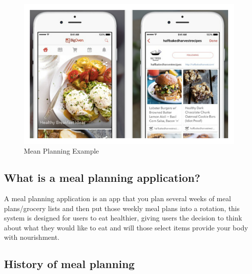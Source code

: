 \begin{center}
  \begin{figure}[H]
    \includegraphics[width=\textwidth]{img/mealplanningpic.jpg}
    \caption{Mean Planning Example}
    \label{fig: Example of a Meal Planning System}
  \end{figure}
\end{center}

\subsection{What is a meal planning application?}

A meal planning application is an app that you plan several weeks of meal plans/grocery lists and then put those weekly meal plans into a rotation, this system is designed for users to eat healthier, giving users the decision to think about what they would like to eat and will those select items provide your body with nourishment.

\subsection{History of meal planning}

